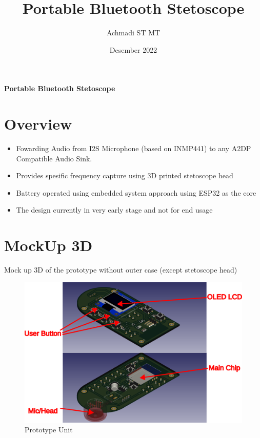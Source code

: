 \documentclass[a4paper,12pt,oneside,pdflatex,italian,final,twocolumn]{article}
\title{Portable Bluetooth Stetoscope}
\author{Achmadi ST MT}
\date{Desember 2022}
\begin{document}
	
	\pagestyle{fancy}
	
	\chead{\today}
	
	\onecolumn
	
	\begin{figure}
		
	\end{figure}\begin{minipage}{0.47\textwidth}
		\centering
		
	\end{minipage}
	\hfill
	\begin{minipage}{0.47\textwidth}
		\raggedleft
		\Huge \textbf{Portable Bluetooth Stetoscope}
	\end{minipage}

	\section{Overview}
	
	\begin{itemize}
		\item Fowarding Audio from I2S Microphone (based on INMP441) to any A2DP Compatible Audio Sink.
		
		\item Provides spesific frequency capture using 3D printed stetoscope head
		
		\item Battery operated using embedded system approach using ESP32 as the core
		
		\item The design currently in very early stage and not for end usage
		
	\end{itemize}
	
	\raggedright
	\section{MockUp 3D}
	
	Mock up 3D of the prototype without outer case (except stetoscope head)
	
	\centering
	\begin{figure}[!ht]
		\centering
		\includegraphics[width=\textwidth,]{images/steto_overview.png}
		\caption{Prototype Unit}
	\end{figure}
\end{document}
